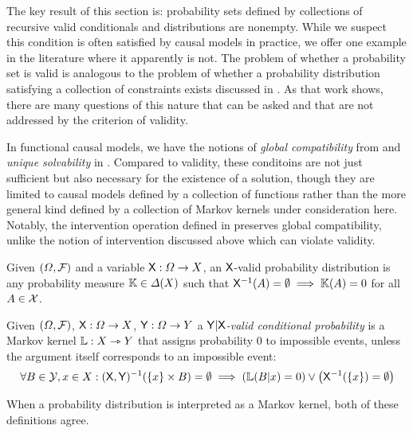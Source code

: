 The key result of this section is: probability sets defined by collections of recursive valid conditionals and distributions are nonempty. While we suspect this condition is often satisfied by causal models in practice, we offer one example in the literature where it apparently is not. The problem of whether a probability set is valid is analogous to the problem of whether a probability distribution satisfying a collection of constraints exists discussed in \citet{vorobev_consistent_1962}. As that work shows, there are many questions of this nature that can be asked and that are not addressed by the criterion of validity.

In functional causal models, we have the notions of \emph{global compatibility} from \citet{forre_causal_2020} and \emph{unique solvability} in \citet{bongers_theoretical_2016}. Compared to validity, these conditoins are not just sufficient but also necessary for the existence of a solution, though they are limited to causal models defined by a collection of functions rather than the more general kind defined by a collection of Markov kernels under consideration here. Notably, the intervention operation defined in \citet{forre_causal_2020} preserves global compatibility, unlike the notion of intervention discussed above which can violate validity.

\begin{definition}\label{def:valid_dist}
Given $(\Omega,\mathcal{F})$ and a variable $\mathsf{X}:\Omega\to X$, an $\mathsf{X}$-valid probability distribution is any probability measure $\mathbb{K}\in \Delta(X)$ such that $\mathsf{X}^{-1}(A)=\emptyset\implies \mathbb{K}(A) = 0$ for all $A\in\mathcal{X}$.
\end{definition}

\begin{definition}\label{def:valid_conditional_prob}
Given $(\Omega,\mathcal{F})$, $\mathsf{X}:\Omega\to X$, $\mathsf{Y}:\Omega\to Y$ a \emph{$\mathsf{Y}|\mathsf{X}$-valid conditional probability} is a Markov kernel $\mathbb{L}:X\rightarrowtriangle Y$ that assigns probability 0 to impossible events, unless the argument itself corresponds to an impossible event:
\begin{align}
    \forall B\in \mathcal{Y}, x\in X: (\mathsf{X},\mathsf{Y})^{-1} (\{x\}\times B) = \emptyset \implies \left(\mathbb{L}(B|x) = 0\right) \lor \left(\mathsf{X}^{-1} (\{x\}) = \emptyset\right)
\end{align}
\end{definition}

When a probability distribution is interpreted as a Markov kernel, both of these definitions agree.

